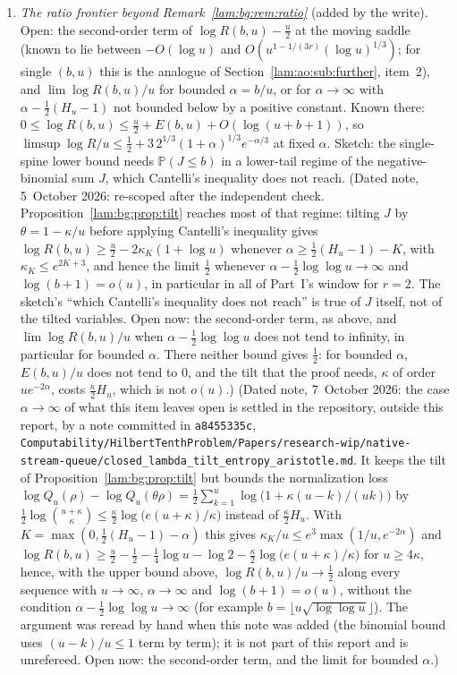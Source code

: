 \documentclass[11pt,a4paper]{article}
\numberwithin{equation}{section}
\theoremstyle{remark}
\newcommand{\Prob}{\mathbb P}
\newcommand{\file}[1]{\nolinkurl{#1}}
\begin{document}
\begin{enumerate}
\item \emph{The ratio frontier beyond Remark~\ref{lam:bg:rem:ratio}} (added by the write). Open: the second-order term of $\log R(b,u)-\frac u2$ at the moving saddle (known to lie between $-O(\log u)$ and $O(u^{1-1/(3r)}(\log u)^{1/3})$; for single $(b,u)$ this is the analogue of Section~\ref{lam:ao:sub:further}, item~2), and $\lim\log R(b,u)/u$ for bounded $\alpha=b/u$, or for $\alpha\to\infty$ with $\alpha-\frac12(H_u-1)$ not bounded below by a positive constant. Known there: $0\le\log R(b,u)\le\frac u2+E(b,u)+O(\log(u+b+1))$, so $\limsup\log R/u\le\frac12+3\,2^{1/3}(1+\alpha)^{1/3}e^{-\alpha/3}$ at fixed $\alpha$. Sketch: the single-spine lower bound needs $\Prob(J\le b)$ in a lower-tail regime of the negative-binomial sum $J$, which Cantelli's inequality does not reach. (Dated note, 5~October 2026: re-scoped after the independent check. Proposition~\ref{lam:bg:prop:tilt} reaches most of that regime: tilting $J$ by $\theta=1-\kappa/u$ before applying Cantelli's inequality gives $\log R(b,u)\ge\frac u2-2\kappa_K(1+\log u)$ whenever $\alpha\ge\frac12(H_u-1)-K$, with $\kappa_K\le e^{2K+3}$, and hence the limit $\frac12$ whenever $\alpha-\frac12\log\log u\to\infty$ and $\log(b+1)=o(u)$, in particular in all of Part~I's window for $r=2$. The sketch's ``which Cantelli's inequality does not reach'' is true of $J$ itself, not of the tilted variables. Open now: the second-order term, as above, and $\lim\log R(b,u)/u$ when $\alpha-\frac12\log\log u$ does not tend to infinity, in particular for bounded $\alpha$. There neither bound gives $\frac12$: for bounded $\alpha$, $E(b,u)/u$ does not tend to $0$, and the tilt that the proof needs, $\kappa$ of order $ue^{-2\alpha}$, costs $\frac\kappa2H_u$, which is not $o(u)$.) (Dated note, 7~October 2026: the case $\alpha\to\infty$ of what this item leaves open is settled in the repository, outside this report, by a note committed in \texttt{a8455335c}, \file{Computability/HilbertTenthProblem/Papers/research-wip/native-stream-queue/closed_lambda_tilt_entropy_aristotle.md}. It keeps the tilt of Proposition~\ref{lam:bg:prop:tilt} but bounds the normalization loss $\log Q_u(\rho)-\log Q_u(\theta\rho)=\frac12\sum_{k=1}^u\log\bigl(1+\kappa(u-k)/(uk)\bigr)$ by $\frac12\log\binom{u+\kappa}{\kappa}\le\frac\kappa2\log\bigl(e(u+\kappa)/\kappa\bigr)$ instead of $\frac\kappa2H_u$. With $K=\max(0,\frac12(H_u-1)-\alpha)$ this gives $\kappa_K/u\le e^3\max(1/u,e^{-2\alpha})$ and $\log R(b,u)\ge\frac u2-\frac12-\frac14\log u-\log2-\frac\kappa2\log\bigl(e(u+\kappa)/\kappa\bigr)$ for $u\ge4\kappa$, hence, with the upper bound above, $\log R(b,u)/u\to\frac12$ along every sequence with $u\to\infty$, $\alpha\to\infty$ and $\log(b+1)=o(u)$, without the condition $\alpha-\frac12\log\log u\to\infty$ (for example $b=\lfloor u\sqrt{\log\log u}\rfloor$). The argument was reread by hand when this note was added (the binomial bound uses $(u-k)/u\le1$ term by term); it is not part of this report and is unrefereed. Open now: the second-order term, and the limit for bounded $\alpha$.)
\end{enumerate}
\end{document}
